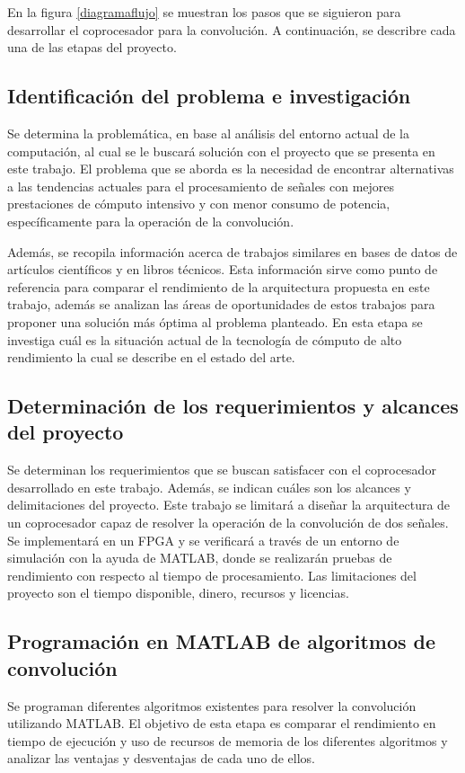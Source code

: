 \newpage
En la figura \ref{diagramaflujo} se muestran los pasos que se siguieron para desarrollar el coprocesador para la convolución. A continuación, se describre cada una de las etapas del proyecto.

\subsection{Identificación del problema e investigación}
Se determina la problemática, en base al análisis del entorno actual de la computación, al cual se le buscará solución con el proyecto que se presenta en este trabajo. El problema que se aborda es la necesidad de encontrar alternativas a las tendencias actuales para el procesamiento de señales con mejores prestaciones de cómputo intensivo y con menor consumo de potencia, específicamente para la operación de la convolución.

Además, se recopila información acerca de trabajos similares en bases de datos de artículos científicos y en libros técnicos. Esta información sirve como punto de referencia para comparar el rendimiento de la arquitectura propuesta en este trabajo, además se analizan las áreas de oportunidades de estos trabajos para proponer una solución más óptima al problema planteado. En esta etapa se investiga cuál es la situación actual de la tecnología de cómputo de alto rendimiento la cual se describe en el estado del arte.

\subsection{Determinación de los requerimientos y alcances del proyecto}
Se determinan los requerimientos que se buscan satisfacer con el coprocesador desarrollado en este trabajo. Además, se indican cuáles son los alcances y delimitaciones del proyecto. Este trabajo se limitará a diseñar  la arquitectura de un coprocesador capaz de resolver la operación de la convolución de dos señales. Se implementará en un FPGA y se verificará a través de un entorno de simulación con la ayuda de MATLAB, donde se realizarán pruebas de rendimiento con respecto al tiempo de procesamiento. Las limitaciones del proyecto son el tiempo disponible, dinero, recursos y licencias.

\subsection{Programación en MATLAB de algoritmos de convolución}
Se programan diferentes algoritmos existentes para resolver la convolución utilizando MATLAB. El objetivo de esta etapa es comparar el rendimiento en tiempo de ejecución y uso de recursos de memoria de los diferentes algoritmos y analizar las ventajas y desventajas de cada uno de ellos. 

